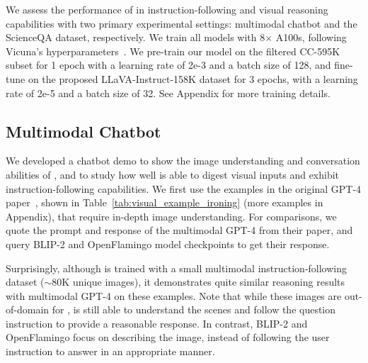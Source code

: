 We assess the performance of \shortname{} in  instruction-following and visual reasoning capabilities with two primary experimental settings: multimodal chatbot and the ScienceQA dataset, respectively.
We train all models with 8$\times$ A100s, following Vicuna's hyperparameters~\cite{vicuna}. We pre-train our model on the filtered CC-595K subset for 1 epoch with a learning rate of 2e-3 and a batch size of 128, and fine-tune on the proposed LLaVA-Instruct-158K dataset for 3 epochs, with a learning rate of 2e-5 and a batch size of 32.  See Appendix for more training details.

\subsection{Multimodal Chatbot}

We developed a chatbot demo to show the image understanding and conversation abilities of \shortname{}, and to study how well \shortname{} is able to digest visual inputs and exhibit instruction-following capabilities.
%
We first use the examples in the original GPT-4 paper~\cite{gpt4}, shown in Table~\ref{tab:visual_example_ironing} (more examples in Appendix), that require in-depth image understanding. For comparisons, we quote the prompt and response of the multimodal GPT-4 from their paper, and query BLIP-2 and OpenFlamingo model checkpoints to get their response.

Surprisingly, although \shortname{} is trained with a small multimodal instruction-following dataset ($\sim$80K unique images), it demonstrates quite similar reasoning results with multimodal GPT-4 on these examples. Note that while these images are out-of-domain for \shortname{}, \shortname{} is still able to understand the scenes and follow the question instruction to provide a reasonable response. In contrast, BLIP-2 and OpenFlamingo focus on describing the image, instead of following the user instruction to answer in an appropriate manner.

